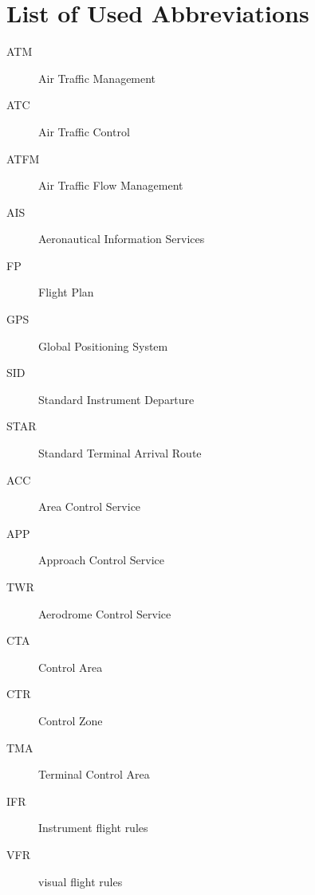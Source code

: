 \chapter{List of Used Abbreviations}

\begin{description}
\item[ATM] Air Traffic Management
\item[ATC] Air Traffic Control
\item[ATFM] Air Traffic Flow Management
\item[AIS] Aeronautical Information Services
\item[FP] Flight Plan
\item[GPS] Global Positioning System
\item[SID] Standard Instrument Departure
\item[STAR] Standard Terminal Arrival Route
\item[ACC] Area Control Service
\item[APP] Approach Control Service
\item[TWR] Aerodrome Control Service
\item[CTA] Control Area
\item[CTR] Control Zone
\item[TMA] Terminal Control Area
\item[IFR] Instrument flight rules
\item[VFR] visual flight rules

\end{description}